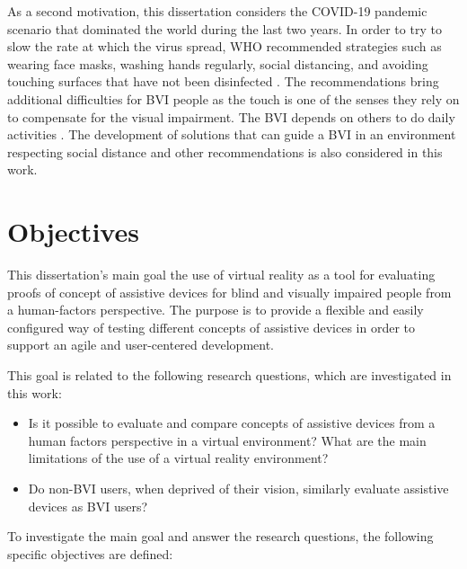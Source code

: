 As a second motivation, this dissertation considers the COVID-19 pandemic scenario that dominated the world during the last two years. In order to try to slow the rate at which the virus spread, WHO recommended strategies such as wearing face masks, washing hands regularly, social distancing, and avoiding touching surfaces that have not been disinfected \cite{who_2020}. The recommendations bring additional difficulties for BVI people as the touch is one of the senses they rely on to compensate for the visual impairment. The BVI depends on others to do daily activities \cite{jondani2021strategies}. The development of solutions that can guide a BVI in an environment respecting social distance and other recommendations is also considered in this work.

\section{Objectives}
\label{sec:objetivos}

 This dissertation's main goal the use of virtual reality as a tool for evaluating proofs of concept of assistive devices for blind and visually impaired people from a human-factors perspective. The purpose is to provide a flexible and easily configured way of testing different concepts of assistive devices in order to support an agile and user-centered development.

 This goal is related to the following research questions, which are investigated in this work:

 \begin{itemize}
    \item Is it possible to evaluate and compare concepts of assistive devices from a human factors perspective in a virtual environment? What are the main limitations of the use of a virtual reality environment? \label{itm:obj_first}
    \item Do non-BVI users, when deprived of their vision, similarly evaluate assistive devices as BVI users? \label{itm:obj_second}
\end{itemize}
  
 To investigate the main goal and answer the research questions, the following specific objectives are defined:
 
